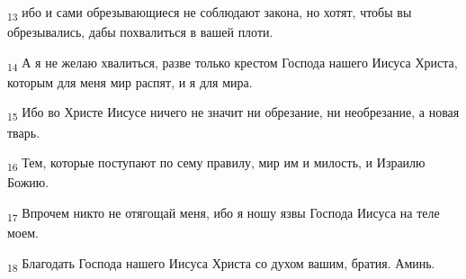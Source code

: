 \begin{tcolorbox}
\textsubscript{13} ибо и сами обрезывающиеся не соблюдают закона, но хотят, чтобы вы обрезывались, дабы похвалиться в вашей плоти.
\end{tcolorbox}
\begin{tcolorbox}
\textsubscript{14} А я не желаю хвалиться, разве только крестом Господа нашего Иисуса Христа, которым для меня мир распят, и я для мира.
\end{tcolorbox}
\begin{tcolorbox}
\textsubscript{15} Ибо во Христе Иисусе ничего не значит ни обрезание, ни необрезание, а новая тварь.
\end{tcolorbox}
\begin{tcolorbox}
\textsubscript{16} Тем, которые поступают по сему правилу, мир им и милость, и Израилю Божию.
\end{tcolorbox}
\begin{tcolorbox}
\textsubscript{17} Впрочем никто не отягощай меня, ибо я ношу язвы Господа Иисуса на теле моем.
\end{tcolorbox}
\begin{tcolorbox}
\textsubscript{18} Благодать Господа нашего Иисуса Христа со духом вашим, братия. Аминь.
\end{tcolorbox}
